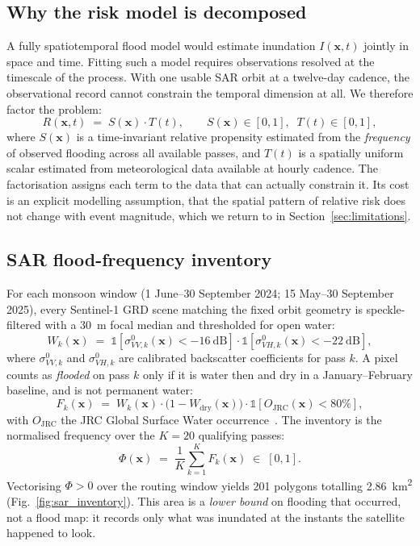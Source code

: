 \documentclass[10pt,twocolumn]{article}
\newcommand{\Sx}{S(\mathbf{x})}
\newcommand{\Tt}{T(t)}
\newcommand{\Rxt}{R(\mathbf{x},t)}
\begin{document}
\subsection{Why the risk model is decomposed}
\label{sec:method-decomp}
A fully spatiotemporal flood model would estimate inundation
$I(\mathbf{x},t)$ jointly in space and time. Fitting such a model requires
observations resolved at the timescale of the process. With one usable SAR orbit
at a twelve-day cadence, the observational record cannot constrain the temporal
dimension at all. We therefore factor the problem:
\begin{equation}
\Rxt \;=\; \Sx \cdot \Tt,
\qquad \Sx\in[0,1],\;\; \Tt\in[0,1],
\label{eq:fusion}
\end{equation}
where $\Sx$ is a time-invariant relative propensity estimated from the
\emph{frequency} of observed flooding across all available passes, and $\Tt$ is a
spatially uniform scalar estimated from meteorological data available at hourly
cadence. The factorisation assigns each term to the data that can actually
constrain it. Its cost is an explicit modelling assumption, that the spatial
pattern of relative risk does not change with event magnitude, which we return to
in Section~\ref{sec:limitations}.

\subsection{SAR flood-frequency inventory}
For each monsoon window (1 June--30 September 2024; 15 May--30 September 2025),
every Sentinel-1 GRD scene matching the fixed orbit geometry is speckle-filtered
with a \SI{30}{\metre} focal median and thresholded for open water:
\begin{equation}
W_k(\mathbf{x}) \;=\;
\mathbb{1}\!\left[\sigma^0_{VV,k}(\mathbf{x}) < \SI{-16}{\deci\bel}\right]\cdot
\mathbb{1}\!\left[\sigma^0_{VH,k}(\mathbf{x}) < \SI{-22}{\deci\bel}\right],
\label{eq:water}
\end{equation}
where $\sigma^0_{VV,k}$ and $\sigma^0_{VH,k}$ are calibrated backscatter
coefficients for pass $k$. A pixel counts as \emph{flooded} on pass $k$ only if it
is water then and dry in a January--February baseline, and is not permanent water:
\begin{equation}
F_k(\mathbf{x}) \;=\; W_k(\mathbf{x})\cdot\bigl(1-W_{\text{dry}}(\mathbf{x})\bigr)
\cdot\mathbb{1}\!\left[O_{\text{JRC}}(\mathbf{x}) < 80\%\right],
\label{eq:floodpass}
\end{equation}
with $O_{\text{JRC}}$ the JRC Global Surface Water occurrence~\citep{pekel2016}.
The inventory is the normalised frequency over the $K=20$ qualifying passes:
\begin{equation}
\Phi(\mathbf{x}) \;=\; \frac{1}{K}\sum_{k=1}^{K} F_k(\mathbf{x}) \;\in\; [0,1].
\label{eq:freq}
\end{equation}
Vectorising $\Phi>0$ over the routing window yields 201 polygons totalling
\SI{2.86}{\kilo\metre\squared} (Fig.~\ref{fig:sar_inventory}). This area is a
\emph{lower bound} on flooding that occurred, not a flood map: it records only
what was inundated at the instants the satellite happened to look.
\end{document}
